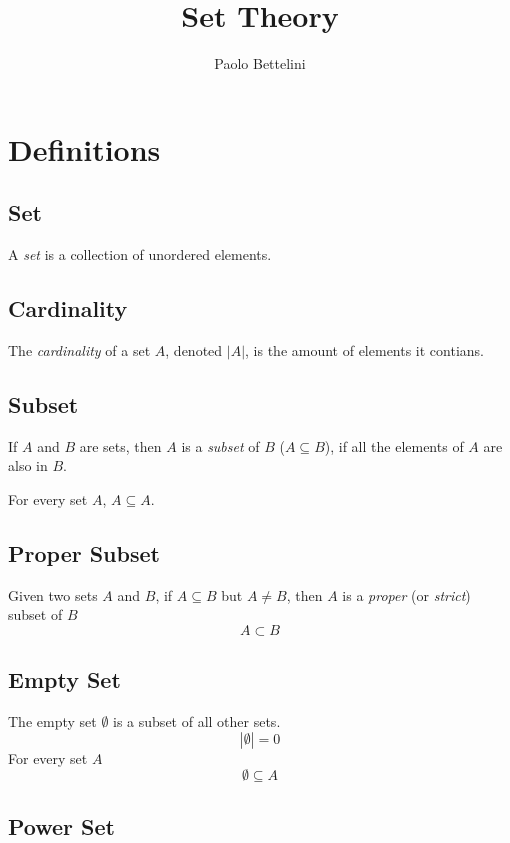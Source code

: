 \documentclass[a4paper]{article}
\title{Set Theory}
\author{Paolo Bettelini}
\date{}
\begin{document}
\maketitle
\tableofcontents
\pagebreak


\section{Definitions}

\subsection{Set}

A \textit{set} is a collection of unordered elements.

\subsection{Cardinality}

The \textit{cardinality} of a set \(A\), denoted \(|A|\),
is the amount of elements it contians.

\subsection{Subset}

If \(A\) and \(B\) are sets, then \(A\) is a \textit{subset} of \(B\)
(\(A\subseteq B\)), if all the elements of \(A\) are also in \(B\).

For every set \(A\), \(A \subseteq A\).

\subsection{Proper Subset}

Given two sets \(A\) and \(B\), if \(A \subseteq B\) but \(A \neq B\),
then \(A\) is a \textit{proper} (or \textit{strict}) subset of \(B\)
\[
    A \subset B
\]

\subsection{Empty Set}

The empty set \(\emptyset\) is a subset of all other sets.
\[
    |\emptyset|=0
\]
For every set \(A\)
\[
    \emptyset \subseteq A
\]

\subsection{Power Set}
\end{document}

